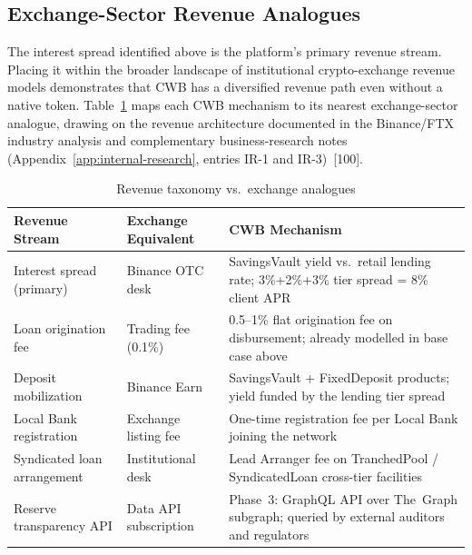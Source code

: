 \documentclass[12pt, a4paper]{report}
\newcommand{\tableheadcolor}{\rowcolor{TableHeadBg}}
\begin{document}
\vspace{2pt}

\subsection{Exchange-Sector Revenue Analogues}
\label{sec:revenue-analogues}

\noindent The interest spread identified above is the platform's primary revenue stream. Placing it within the broader landscape of institutional crypto-exchange revenue models demonstrates that CWB has a diversified revenue path even without a native token. Table~\ref{tab:revenue-taxonomy} maps each CWB mechanism to its nearest exchange-sector analogue, drawing on the revenue architecture documented in the Binance/FTX industry analysis and complementary business-research notes (Appendix~\ref{app:internal-research}, entries IR-1 and IR-3)~[100].

\begin{table}[H]
\centering
\caption[Revenue taxonomy vs.\ exchange analogues]{Revenue taxonomy vs.\ exchange analogues}
\label{tab:revenue-taxonomy}
\begin{tabular}{p{3.8cm}p{3.8cm}p{5.6cm}}
\toprule
\tableheadcolor
\textbf{Revenue Stream} & \textbf{Exchange Equivalent} & \textbf{CWB Mechanism} \\
\midrule
Interest spread (primary) & Binance OTC desk & SavingsVault yield vs.\ retail lending rate; 3\%+2\%+3\% tier spread = 8\% client APR \\
Loan origination fee & Trading fee (0.1\%) & 0.5--1\% flat origination fee on disbursement; already modelled in base case above \\
Deposit mobilization & Binance Earn & SavingsVault + FixedDeposit products; yield funded by the lending tier spread \\
Local Bank registration & Exchange listing fee & One-time registration fee per Local Bank joining the network \\
Syndicated loan arrangement & Institutional desk & Lead Arranger fee on TranchedPool / SyndicatedLoan cross-tier facilities \\
Reserve transparency API & Data API subscription & Phase~3: GraphQL API over The~Graph subgraph; queried by external auditors and regulators \\
\bottomrule
\end{tabular}
\end{table}

\vspace{2pt}
\end{document}

